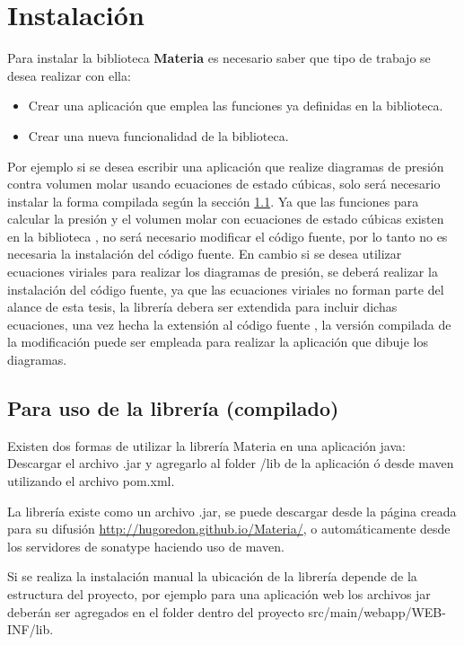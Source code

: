 \chapter{Instalación}

  Para instalar la biblioteca \textbf{Materia} es necesario saber que tipo de trabajo se desea realizar con ella:
  \begin{itemize}
    \item Crear una aplicación que emplea las funciones ya definidas en la biblioteca.
    \item Crear una nueva funcionalidad de la biblioteca.
  \end{itemize}

  Por ejemplo si se desea escribir una aplicación que realize diagramas de presión contra volumen molar usando ecuaciones de estado cúbicas, solo será necesario instalar la forma compilada según la sección \ref{sec:compiledinstall}. Ya que las funciones para calcular la presión y el volumen molar con ecuaciones de estado cúbicas existen en la biblioteca , no será necesario modificar el código fuente, por lo tanto no es necesaria la instalación del código fuente. En cambio si se desea utilizar ecuaciones viriales para realizar los diagramas de presión, se deberá realizar la instalación del código fuente, ya que las ecuaciones viriales no forman parte del alance de esta tesis, la librería debera ser extendida para incluir dichas ecuaciones, una vez hecha la extensión al código fuente , la versión compilada de la modificación puede ser empleada para realizar la aplicación que dibuje   los diagramas.


  \section{Para uso de la librería (compilado)}\label{sec:compiledinstall}

      Existen dos formas de utilizar la librería Materia en una aplicación java:
    Descargar el archivo .jar y agregarlo al folder /lib de la aplicación ó desde maven utilizando el archivo pom.xml.

    La librería existe como un archivo .jar, se puede descargar desde la página creada para su difusión \url{http://hugoredon.github.io/Materia/}, o automáticamente desde los servidores de sonatype haciendo uso de maven.

    Si se realiza la instalación manual la ubicación de la librería depende de la estructura del proyecto, por ejemplo para una aplicación web los archivos jar deberán ser agregados en el folder dentro del proyecto src/main/webapp/WEB-INF/lib.

